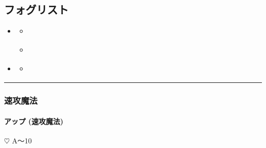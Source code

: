 \documentclass[letterpaper,10pt,dvipdfmx]{sphinxmanual}
\begin{document}
\subsection{フォグリスト}
\label{\detokenize{auto/actionlist:id52}}
\begin{sphinxShadowBox}
\begin{itemize}
\item {} 
\sphinxAtStartPar
{}\label{\detokenize{auto/actionlist:id108}}{\hyperref[\detokenize{auto/actionlist:id54}]{}}
\begin{itemize}
\item {} 
\sphinxAtStartPar
{}\label{\detokenize{auto/actionlist:id109}}{\hyperref[\detokenize{auto/actionlist:fog-upfog}]{}}

\item {} 
\sphinxAtStartPar
{}\label{\detokenize{auto/actionlist:id110}}{\hyperref[\detokenize{auto/actionlist:fog-downfog}]{}}

\end{itemize}

\item {} 
\sphinxAtStartPar
{}\label{\detokenize{auto/actionlist:id111}}{\hyperref[\detokenize{auto/actionlist:id57}]{}}
\begin{itemize}
\item {} 
\sphinxAtStartPar
{}\label{\detokenize{auto/actionlist:id112}}{\hyperref[\detokenize{auto/actionlist:fog-forcefog}]{}}

\end{itemize}

\end{itemize}
\end{sphinxShadowBox}


\bigskip\hrule\bigskip



\subsubsection{速攻魔法}
\label{\detokenize{auto/actionlist:id54}}

\paragraph{アップ (速攻魔法)}
\label{\detokenize{auto/actionlist:fog-upfog}}\label{\detokenize{auto/actionlist:id55}}
\sphinxAtStartPar
{} {\normalsize $\heartsuit$} A〜10
\end{document}

